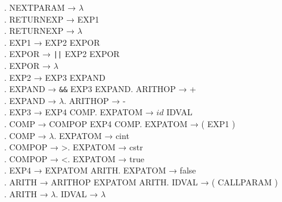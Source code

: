 \begin{tabbing}
    . NEXTPARAM → $\lambda$\\
    . RETURNEXP → EXP1\\
    . RETURNEXP → $\lambda$\\
    . EXP1 → EXP2 EXPOR\\
    . EXPOR → \verb!||! EXP2 EXPOR\\
    . EXPOR → $\lambda$\\
    . EXP2 → EXP3 EXPAND\\
    . EXPAND → \verb!&&! EXP3 EXPAND. ARITHOP → +\\
    . EXPAND → $\lambda$. ARITHOP → -\\
    . EXP3 → EXP4 COMP. EXPATOM → $id$ IDVAL\\
    . COMP → COMPOP EXP4 COMP. EXPATOM → ( EXP1 )\\
    . COMP → $\lambda$. EXPATOM → cint\\
    . COMPOP → >. EXPATOM → cstr\\
    . COMPOP → <. EXPATOM → true\\
    . EXP4 → EXPATOM ARITH. EXPATOM → false\\
    . ARITH → ARITHOP EXPATOM ARITH. IDVAL → ( CALLPARAM )\\
    . ARITH → $\lambda$. IDVAL → $\lambda$\\
\end{tabbing}
